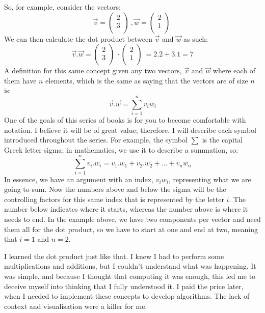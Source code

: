 \documentclass[600paper, 11pt,twoside,openany]{kdp}
\begin{document}
So, for example, consider the vectors:
\[
\overrightarrow{v} = \begin{pmatrix}
 2\\
 3\\
\end{pmatrix}\ ,
\overrightarrow{w} = \begin{pmatrix}
 2\\
 1\\
\end{pmatrix}\ 
\]
\indent We can then calculate the dot product between $\overrightarrow{v}$ and $\overrightarrow{w}$ as such:
\[\overrightarrow{v}.\overrightarrow{w} = \begin{pmatrix}
 2\\
 3\\
\end{pmatrix}\ \cdot \begin{pmatrix}
 2\\
 1\\
\end{pmatrix}\  = 2.2 + 3.1 = 7\]
\indent A definition for this same concept given any two vectors,  $\overrightarrow{v}$ and $\overrightarrow{w}$ where each of them have $n$ elements, which is the same as saying that the vectors are of size $n$ is:
\begin{equation}\label{dotProduct}
\overrightarrow{v}.\overrightarrow{w} = \sum_{i=1}^{n} v_iw_i
\end{equation}
\indent One of the goals of this series of books is for you to become comfortable with notation. I believe it will be of great value; therefore, I will describe each symbol introduced throughout the series. For example, the symbol $\sum$ is the capital Greek letter sigma; in mathematics, we use it to describe a summation, so:
\[\sum_{i=1}^{n} v_i.w_i = v_1.w_1 + v_2.w_2 + ... + v_nw_n\]
\indent In essence, we have an argument with an index, $v_iw_i$, representing what we are going to sum. Now the numbers above and below the sigma will be the controlling factors for this same index that is represented by the letter $i$. The number below indicates where it starts, whereas the number above is where it needs to end. In the example above, we have two components per vector and need them all for the dot product, so we have to start at one and end at two, meaning that $i = 1$ and $n= 2$. 
\par 
\vspace{-3pt}
\indent I learned the dot product just like that. I knew I had to perform some multiplications and additions, but I couldn’t understand what was happening. It was simple, and because I thought that computing it was enough, this led me to deceive myself into thinking that I fully understood it. I paid the price later, when I needed to implement these concepts to develop algorithms. The lack of context and visualisation were a killer for me. 
\end{document}
